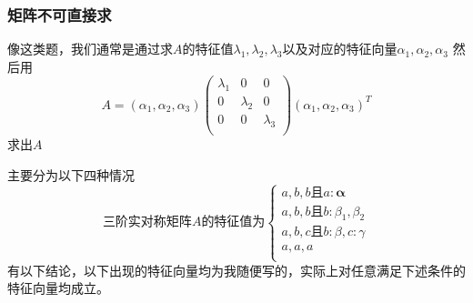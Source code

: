 \documentclass[lang=cn,10pt]{elegantbook}
\begin{document}
\subsubsection{矩阵不可直接求}
像这类题，我们通常是通过求$A$的特征值$\lambda_{1},\lambda_{2},\lambda_{3}$以及对应的特征向量$\alpha_{1},\alpha_{2},\alpha_{3}$
然后用
\begin{equation*}
	A=(\alpha_{1},\alpha_{2},\alpha_{3})\left( \begin{matrix}
		\lambda _1&		0&		0\\
		0&		\lambda _2&		0\\
		0&		0&		\lambda _3\\
	\end{matrix} \right)(\alpha_{1},\alpha_{2},\alpha_{3})^{T}
\end{equation*}
求出$A$

主要分为以下四种情况
\begin{equation*}
	\text{三阶实对称矩阵}A\text{的特征值为}\begin{cases}
		a,b,b\text{且}a:\boldsymbol{\alpha }\\
		a,b,b\text{且}b:\beta _1,\beta _2\\
		a,b,c\text{且}b:\beta ,c:\gamma\\
		a,a,a\\
	\end{cases}
\end{equation*}
有以下结论，以下出现的特征向量均为我随便写的，实际上对任意满足下述条件的特征向量均成立。
\end{document}
